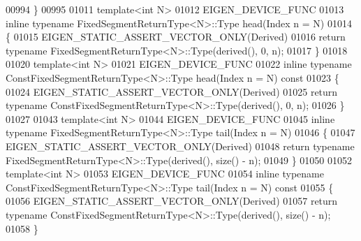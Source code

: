 \begin{DoxyCode}
00994 \}
00995 
01011 \textcolor{keyword}{template}<\textcolor{keywordtype}{int} N>
01012 EIGEN\_DEVICE\_FUNC
01013 \textcolor{keyword}{inline} \textcolor{keyword}{typename} FixedSegmentReturnType<N>::Type head(Index n = N)
01014 \{
01015   EIGEN\_STATIC\_ASSERT\_VECTOR\_ONLY(Derived)
01016   \textcolor{keywordflow}{return} \textcolor{keyword}{typename} FixedSegmentReturnType<N>::Type(derived(), 0, n);
01017 \}
01018 
01020 \textcolor{keyword}{template}<\textcolor{keywordtype}{int} N>
01021 EIGEN\_DEVICE\_FUNC
01022 \textcolor{keyword}{inline} \textcolor{keyword}{typename} ConstFixedSegmentReturnType<N>::Type head(Index n = N)\textcolor{keyword}{ const}
01023 \textcolor{keyword}{}\{
01024   EIGEN\_STATIC\_ASSERT\_VECTOR\_ONLY(Derived)
01025   \textcolor{keywordflow}{return} \textcolor{keyword}{typename} ConstFixedSegmentReturnType<N>::Type(derived(), 0, n);
01026 \}
01027 
01043 \textcolor{keyword}{template}<\textcolor{keywordtype}{int} N>
01044 EIGEN\_DEVICE\_FUNC
01045 \textcolor{keyword}{inline} \textcolor{keyword}{typename} FixedSegmentReturnType<N>::Type tail(Index n = N)
01046 \{
01047   EIGEN\_STATIC\_ASSERT\_VECTOR\_ONLY(Derived)
01048   \textcolor{keywordflow}{return} \textcolor{keyword}{typename} FixedSegmentReturnType<N>::Type(derived(), size() - n);
01049 \}
01050 
01052 \textcolor{keyword}{template}<\textcolor{keywordtype}{int} N>
01053 EIGEN\_DEVICE\_FUNC
01054 \textcolor{keyword}{inline} \textcolor{keyword}{typename} ConstFixedSegmentReturnType<N>::Type tail(Index n = N)\textcolor{keyword}{ const}
01055 \textcolor{keyword}{}\{
01056   EIGEN\_STATIC\_ASSERT\_VECTOR\_ONLY(Derived)
01057   \textcolor{keywordflow}{return} \textcolor{keyword}{typename} ConstFixedSegmentReturnType<N>::Type(derived(), size() - n);
01058 \}
\end{DoxyCode}
